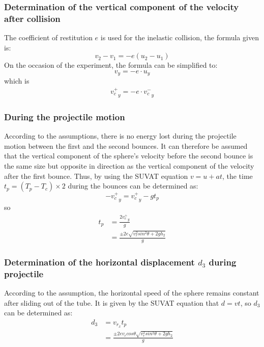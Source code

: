 \documentclass{article}
\begin{document}
        \subsubsection{Determination of the vertical component of the velocity after collision}
            The coefficient of restitution $e$ is used for the inelastic collision, the formula given is:
            \begin{equation}
                v_2 - v_1 = -e(u_2-u_1) \nonumber
            \end{equation}
            On the occasion of the experiment, the formula can be simplified to:
            \begin{equation} 
                v_y = -e\cdot u_y \nonumber
            \end{equation}
            which is 
            \begin{equation}
                \begin{aligned}
                    {v^+_c}_y = -e\cdot {v^-_c}_y
                \end{aligned}  
            \end{equation}
        \subsubsection{During the projectile motion}
        According to the assumptions, there is no energy lost during the projectile motion between the first and the second bounces. It can therefore be assumed that the vertical component of the sphere's velocity before the second bounce is the same size but opposite in direction as the vertical component of the velocity after the first bounce. Thus, by using the SUVAT equation $v = u + at$, the time $t_p = (T_p - T_c)\times2 $ during the bounces can be determined as:
        $$-{v^+_c}_y = {v^+_c}_y - gt_p$$
        so 
        \begin{equation}
            \begin{aligned}
                t_p &= \frac{2{v^+_c}_y}{g}\\
                    &= \frac{\pm2e\sqrt{{v^2_{r}sin^2\theta}+2gh_2}}{g}
            \end{aligned}
        \end{equation}
        \subsubsection{Determination of the horizontal displacement $d_3$ during projectile}
        According to the assumption, the horizontal speed of the sphere remains constant after sliding out of the tube. It is given by the SUVAT equation that $d = vt$, so $d_3$ can be determined as:
        \begin{equation}
            \begin{aligned}
                d_3 &= v_{r_x}t_p\\
                &=  \frac{\pm2ev_rcos\theta\sqrt{{v^2_{r}sin^2\theta}+2gh_2}}{g}
            \end{aligned}
        \end{equation}
\end{document}
